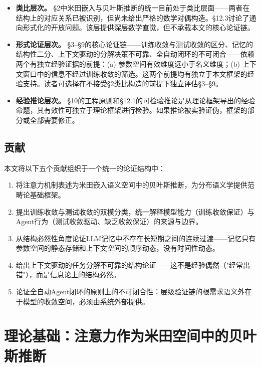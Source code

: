 \documentclass[11pt,a4paper]{ctexart}
\begin{document}
\begin{itemize}[leftmargin=*]
    \item \textbf{类比层次。} §2中米田嵌入与贝叶斯推断的统一目前处于类比层面——两者在结构上的对应关系已被识别，但尚未给出严格的数学对偶构造。§12.3讨论了通向形式化的开放问题。该层提供深层数学直觉，但不承载本文的核心论证链。

    \item \textbf{形式论证层次。} §3--§9的核心论证链——训练收敛与测试收敛的区分、记忆的结构性二分、上下文驱动的分解决策不可靠、全自动闭环的不可闭合——依赖两个有独立经验证据的前提：(a) 参数空间有效维度远小于名义维度\cite{Li2018IntrinsicDim,Aghajanyan2020}；(b) 上下文窗口中的信息不经过训练收敛的筛选。这两个前提均有独立于本文框架的经验支持。读者可选择在不接受§2类比构造的前提下独立评估§3--§9。

    \item \textbf{经验推论层次。} §10的工程原则和§12.1的可检验推论是从理论框架导出的经验命题，其有效性可独立于理论框架进行检验。如果推论被实验证伪，框架的部分或全部需要修正。
\end{itemize}

\subsection{贡献}

本文将以下五个贡献组织于一个统一的论证结构中：

\begin{enumerate}[leftmargin=*,label=\textbf{C\arabic*}.]
    \item 将注意力机制表述为米田嵌入语义空间中的贝叶斯推断，为分布语义学提供范畴论基础框架。
    \item 提出训练收敛与测试收敛的双模分类，统一解释模型能力（训练收敛保证）与Agent行为（测试收敛驱动、缺乏收敛保证）的来源与边界。
    \item 从结构必然性角度论证LLM记忆中不存在长短期之间的连续过渡——记忆只有参数空间的静态存储和上下文空间的顺序动态，没有时间性动态。
    \item 给出上下文驱动的任务分解不可靠的结构论证——这不是经验偶然（"经常出错"），而是信息论上的结构必然。
    \item 论证全自动Agent闭环的原则上的不可闭合性：层级验证链的根需求语义外在于模型的收敛空间，必须由系统外部提供。
\end{enumerate}


\section{理论基础：注意力作为米田空间中的贝叶斯推断}
\end{document}
